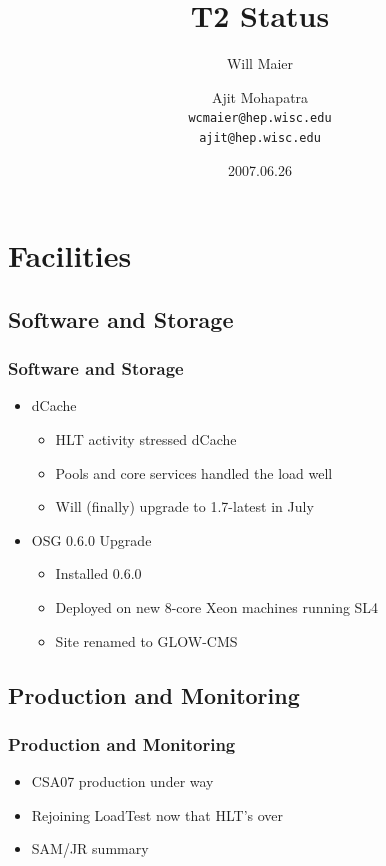 \documentclass{beamer}
\title{T2 Status}
\author[Maier, Mohapatra]{
    Will Maier \and Ajit Mohapatra\\ 
    {\tt wcmaier@hep.wisc.edu}\\
    {\tt ajit@hep.wisc.edu}}
\institute[Wisconsin]{University of Wisconsin - High Energy Physics}
\date{2007.06.26}
\begin{document}
\begin{frame}
    \titlepage
\end{frame}

\section{Facilities}
\subsection{Software and Storage}
\begin{frame}
    \frametitle{Software and Storage}
    \begin{itemize}
        \item dCache
        \begin{itemize}
            \item HLT activity stressed dCache
            \item Pools and core services handled the load well
            \item Will (finally) upgrade to 1.7-latest in July
        \end{itemize}
        \item OSG 0.6.0 Upgrade
        \begin{itemize}
            \item Installed 0.6.0
            \item Deployed on new 8-core Xeon machines running SL4
            \item Site renamed to GLOW-CMS
        \end{itemize}
    \end{itemize}
\end{frame}

\subsection{Production and Monitoring}
\begin{frame}
    \frametitle{Production and Monitoring}
    \begin{itemize}
        \item CSA07 production under way
        \item Rejoining LoadTest now that HLT's over
        \item SAM/JR summary
    \end{itemize}
\end{frame}
\end{document}
